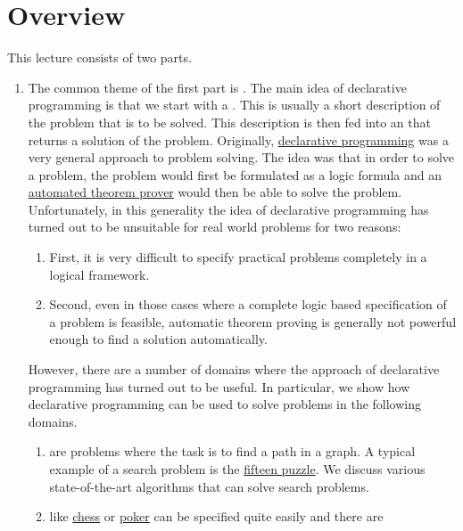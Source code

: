 \section{Overview}
This lecture consists of two parts.
\begin{enumerate}
\item The common theme of the first part is .  The main idea of declarative
      programming is that we start with a .  This is usually a short description of
      the problem that is to be solved.  This description is then fed into an 
      that returns a solution of the problem.  Originally, 
      \href{https://en.wikipedia.org/wiki/Declarative_programming}{declarative programming} was a very general
      approach to problem solving.  The idea was that in order to solve a problem, the problem would first be
      formulated as a logic formula and an
      \href{https://en.wikipedia.org/wiki/Automated_theorem_proving}{automated theorem prover} would then be
      able to solve the problem.  Unfortunately, in this generality the idea of declarative programming has
      turned out to be unsuitable for real world problems for two reasons:
      \begin{enumerate}
      \item First, it is very difficult to specify practical problems completely in a logical framework.
      \item Second, even in those cases where a complete logic based specification of a problem is feasible,
            automatic theorem proving is generally not powerful enough to find a solution automatically. 
      \end{enumerate}
      However, there are a number of domains where the approach of declarative programming has turned out to be
      useful.  In particular, we show how declarative programming can be used to solve problems in the
      following domains.
      \begin{enumerate}
      \item {} are problems where the task is to find a path in a graph.  A typical example of a
            search problem is the \href{https://en.wikipedia.org/wiki/15_puzzle}{fifteen puzzle}.
            We discuss various state-of-the-art algorithms that can solve search problems.
      \item {} like \href{https://en.wikipedia.org/wiki/Chess}{chess} or
            \href{https://en.wikipedia.org/wiki/Poker}{poker} can be specified quite easily and there are

\end{enumerate}
\end{enumerate}
